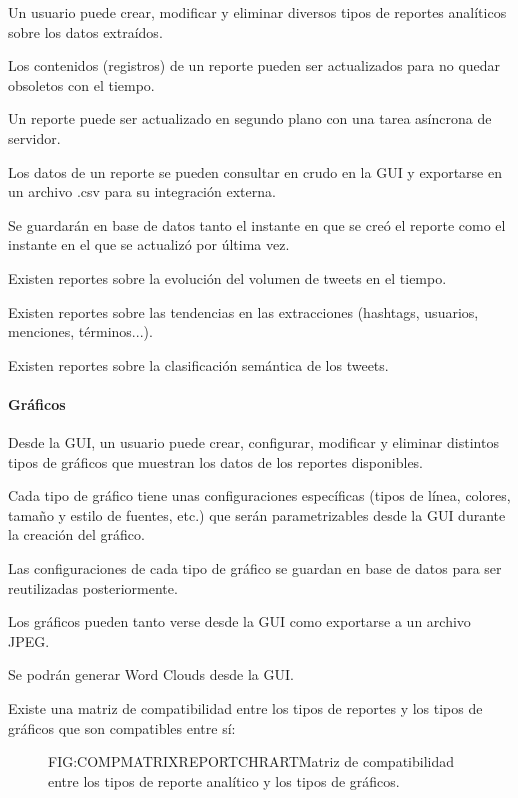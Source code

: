 \begin{functional}
\item Un usuario puede crear, modificar y eliminar diversos tipos de reportes analíticos sobre los datos extraídos.
\item Los contenidos (registros) de un reporte pueden ser actualizados para no quedar obsoletos con el tiempo.
\item Un reporte puede ser actualizado en segundo plano con una tarea asíncrona de servidor.
\item Los datos de un reporte se pueden consultar en crudo en la GUI y exportarse en un archivo .csv para su integración externa.
\item Se guardarán en base de datos tanto el instante en que se creó el reporte como el instante en el que se actualizó por última vez.
\item Existen reportes sobre la evolución del volumen de tweets en el tiempo. 
\item Existen reportes sobre las tendencias en las extracciones (hashtags, usuarios, menciones, términos...).
\item Existen reportes sobre la clasificación semántica de los tweets.
\paragraph{Gráficos}
\item Desde la GUI, un usuario puede crear, configurar, modificar y eliminar distintos tipos de gráficos que muestran los datos de los reportes disponibles.
\item Cada tipo de gráfico tiene unas configuraciones específicas (tipos de línea, colores, tamaño y estilo de fuentes, etc.) que serán parametrizables desde la GUI durante la creación del gráfico. 
\item Las configuraciones de cada tipo de gráfico se guardan en base de datos para ser reutilizadas posteriormente.
\item Los gráficos pueden tanto verse desde la GUI como exportarse a un archivo JPEG.
\item Se podrán generar Word Clouds desde la GUI.
\item Existe una matriz de compatibilidad entre los tipos de reportes y los tipos de gráficos que son compatibles entre sí:
\begin{figure}[Matriz de compatibilidad reporte-gráfico]{FIG:COMPMATRIXREPORTCHRART}{Matriz de compatibilidad entre los tipos de reporte analítico y los tipos de gráficos.}
\end{figure}

\end{functional}
